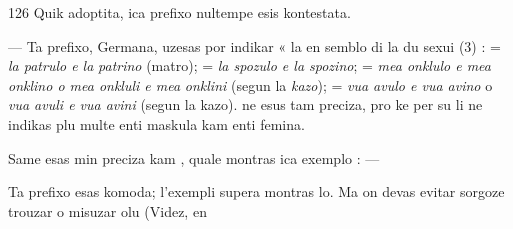 \begin{VUpage}[130]{126}
Quik adoptita, ica prefixo nultempe esis kontestata.

 --- Ta prefixo, Germana, uzesas por indikar « la en\cc
semblo di la du sexui (3) :  = \textit{la patrulo e la}\nl
\textit{patrino} (matro);  = \textit{la spozulo e la spozino}; \nl
{} = \textit{mea onklulo e mea onklino o mea onkluli e mea}\nl
\textit{onklini} (segun la \textit{kazo});  = \textit{vua avulo e vua avino}\nl
o \textit{vua avuli e vua avini} (segun la kazo). \nl
{} ne esus tam preciza, pro ke per su li ne indikas plu\nl
multe enti maskula kam enti femina.

Same  esas min preciza kam , quale montras\nl
ica exemplo :  --- \nl
{}

Ta prefixo esas komoda; l'exempli supera montras lo. Ma\nl
on devas evitar sorgoze trouzar o misuzar olu (Videz, en\parplein
\end{VUpage}

